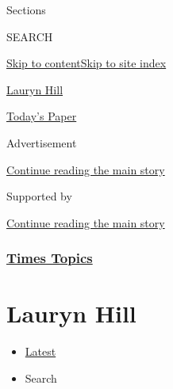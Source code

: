 Sections

SEARCH

\protect\hyperlink{site-content}{Skip to
content}\protect\hyperlink{site-index}{Skip to site index}

\href{https://www.nytimes3xbfgragh.onion/topic/person/lauryn-hill}{Lauryn
Hill}

\href{https://myaccount.nytimes3xbfgragh.onion/auth/login?response_type=cookie\&client_id=vi}{}

\href{https://www.nytimes3xbfgragh.onion/section/todayspaper}{Today's
Paper}

Advertisement

\protect\hyperlink{after-top}{Continue reading the main story}

Supported by

\protect\hyperlink{after-sponsor}{Continue reading the main story}

\hypertarget{times-topics}{%
\subsubsection{\texorpdfstring{\href{/index.html}{Times
Topics}}{Times Topics}}\label{times-topics}}

\hypertarget{lauryn-hill}{%
\section{Lauryn Hill}\label{lauryn-hill}}

\begin{itemize}
\tightlist
\item
  \protect\hyperlink{stream-panel}{Latest}
\item
  Search
\end{itemize}

